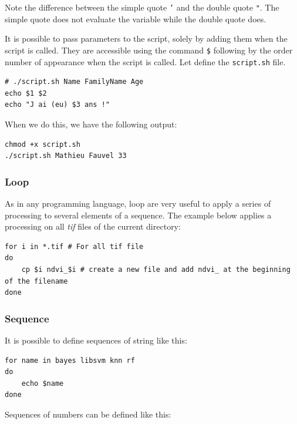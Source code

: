 \documentclass[a4paper,11pt,DIV=18]{scrartcl}
\begin{document}
Note the  difference between the simple  quote \texttt{'} and the  double quote
\texttt{"}. The  simple quote does not  evaluate the variable while  the double
quote does.

It is possible to pass parameters to the script, solely by adding them
when the  script is called.  They are  accessible using the  command \texttt{\$}
following by the order number of appearance when the script is
called. Let define the \texttt{script.sh} file.

\begin{verbatim}
# ./script.sh Name FamilyName Age
echo $1 $2
echo "J ai (eu) $3 ans !"
\end{verbatim}

When we do this, we have the following output:

\begin{verbatim}
chmod +x script.sh
./script.sh Mathieu Fauvel 33
\end{verbatim}

\subsubsection{Loop}
\label{sec:orgheadline50}
As in any programming language, loop are very useful to apply a series
of processing  to several  elements of a  sequence. The  example below
applies a processing on all \emph{tif} files of the current directory:

\begin{verbatim}
for i in *.tif # For all tif file
do
    cp $i ndvi_$i # create a new file and add ndvi_ at the beginning of the filename
done
\end{verbatim}
\subsubsection{Sequence}
\label{sec:orgheadline51}
It is possible to define sequences of string like this:

\begin{verbatim}
for name in bayes libsvm knn rf
do
    echo $name
done
\end{verbatim}

Sequences of numbers can be defined like this:
\end{document}
